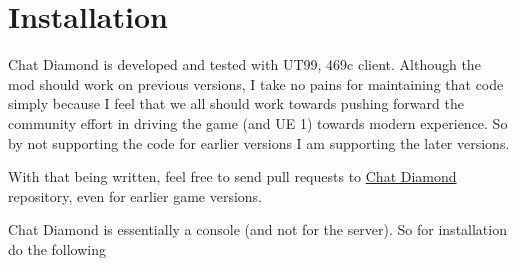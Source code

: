 \documentclass{article}
\theoremstyle{definition}
\begin{document}
\section{Installation}
Chat Diamond is developed and tested with UT99, 469c client.  Although the mod should work on previous versions, I take no pains for maintaining that code simply because I feel that we all should work towards pushing forward the community effort in driving the game (and UE 1) towards modern experience.  So by not supporting the code for earlier versions I am supporting the later versions.

With that being written, feel free to send pull requests to \href{https://github.com/ravimohan1991/ChatDiamond/}{Chat Diamond} repository, even for earlier game versions.

Chat Diamond is essentially a console (and not for the server).  So for installation do the following
\end{document}
